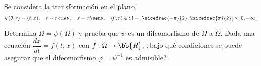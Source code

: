 \documentclass[12pt]{article}
\begin{document}
\begin{ejercicio}
    Se considera la transformación en el plano
    \begin{equation*}
        \psi(\theta, r) = (t, x), \quad t = r\cos \theta, \quad x = r\sen \theta, \quad (\theta, r) \in \Omega = \left]\nicefrac{-\pi}{2}, \nicefrac{\pi}{2}\right[ \times \left]0, +\infty\right[
    \end{equation*}

    Determina $\Omega = \psi(\Omega)$ y prueba que $\psi$ es un difeomorfismo de $\Omega$ a $\Omega$. Dada una ecuación $\dfrac{dx}{dt} = f(t, x)$ con $f : \Omega \to \bb{R}$, ¿bajo qué condiciones se puede asegurar que el difeomorfismo $\varphi = \psi^{-1}$ es admisible?
\end{ejercicio}

    
\end{document}

